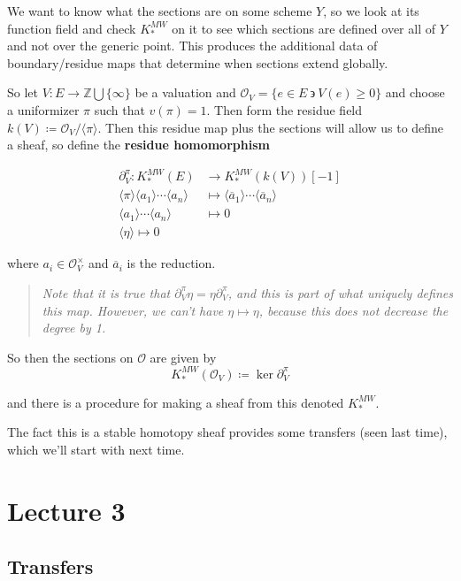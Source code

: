 \documentclass[11pt]{scrreprt}
\theoremstyle{definition}
\newcommand{\ZZ}[0]{{\mathbb{Z}}}
\newcommand{\suchthat}[0]{{~\backepsilon ~}}
\newcommand{\generators}[1]{\langle{#1}\rangle}
\newcommand{\theset}[1]{\{{#1}\}}
\newcommand{\union}[0]{\bigcup}
\newcommand{\del}[0]{{\partial}}
\newcommand{\definedas}[0]{\coloneqq}
\begin{document}
We want to know what the sections are on some scheme \(Y\), so we look
at its function field and check \(K^{MW}_*\) on it to see which sections
are defined over all of \(Y\) and not over the generic point. This
produces the additional data of boundary/residue maps that determine
when sections extend globally.

So let \(V:E \to \ZZ \union \theset\infty\) be a valuation and
\(\mathcal O_V = \theset{e\in E \suchthat V(e) \geq 0}\) and choose a
uniformizer \(\pi\) such that \(v(\pi)=1\). Then form the residue field
\(k(V) \definedas \mathcal O_V / \generators{\pi}\). Then this residue
map plus the sections will allow us to define a sheaf, so define the
\textbf{residue homomorphism}

\begin{align*}
\del_V^\pi: K_*^{MW}(E) &\to K_*^{MW}(k(V))[-1] \\
\generators{\pi}\generators{a_1}\cdots\generators{a_n} &\mapsto \generators{\overline a_1} \cdots\generators{\overline a_n} \\
\generators{a_1} \cdots \generators{a_n} &\mapsto 0 \\
\generators{\eta} \mapsto 0
\end{align*}

where \(a_i \in \mathcal{O}_V^\times\) and \(\overline a_i\) is the
reduction.

\begin{quote}\textit{
Note that it is true that \(\del_V^\pi \eta = \eta \del_V^\pi\), and
this is part of what uniquely defines this map. However, we can't have
\(\eta \mapsto \eta\), because this does not decrease the degree by 1.
}\end{quote}

So then the sections on \(\mathcal O\) are given by \[
K^{MW}_*(\mathcal O_V) \definedas \ker \del_V^\pi
\]

and there is a procedure for making a sheaf from this denoted
\(K_*^{MW}\).

The fact this is a stable homotopy sheaf provides some transfers (seen
last time), which we'll start with next time.

\hypertarget{lecture-3}{%
\chapter{Lecture 3}\label{lecture-3}}

\hypertarget{transfers}{%
\section{Transfers}\label{transfers}}
\end{document}
